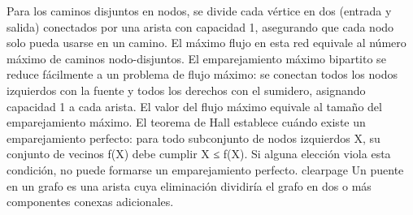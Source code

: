 {}Para los caminos disjuntos en nodos, se divide cada vértice en dos (entrada y salida) conectados por una arista con capacidad 1, asegurando que cada nodo solo pueda usarse en un camino. El máximo flujo en esta red equivale al número máximo de caminos nodo-disjuntos.\markdownRendererInterblockSeparator
{}\markdownRendererParagraphSeparator
{}
\markdownRendererSectionEnd 
\markdownRendererSectionEnd \markdownRendererSectionBegin
{}\markdownRendererInterblockSeparator
{}El emparejamiento máximo bipartito se reduce fácilmente a un problema de flujo máximo: se conectan todos los nodos izquierdos con la fuente y todos los derechos con el sumidero, asignando capacidad 1 a cada arista. El valor del flujo máximo equivale al tamaño del emparejamiento máximo.\markdownRendererParagraphSeparator
{}El teorema de Hall establece cuándo existe un emparejamiento perfecto: para todo subconjunto de nodos izquierdos X, su conjunto de vecinos f(X) debe cumplir \markdownRendererPipe{}X\markdownRendererPipe{} ≤ \markdownRendererPipe{}f(X)\markdownRendererPipe{}. Si alguna elección viola esta condición, no puede formarse un emparejamiento perfecto.\markdownRendererInterblockSeparator
{}\markdownRendererInterblockSeparator
{}\markdownRendererDollarSign{}\markdownRendererBackslash{}clearpage\markdownRendererDollarSign{}\markdownRendererInterblockSeparator
{}
\markdownRendererSectionEnd \markdownRendererSectionBegin
{}\markdownRendererInterblockSeparator
{}Un puente en un grafo es una arista cuya eliminación dividiría el grafo en dos o más componentes conexas adicionales.\markdownRendererInterblockSeparator
{}\markdownRendererInterblockSeparator
{}
\markdownRendererSectionEnd \markdownRendererSectionBegin
{}\markdownRendererInterblockSeparator
{}
\markdownRendererSectionEnd 
\markdownRendererSectionEnd \markdownRendererDocumentEnd